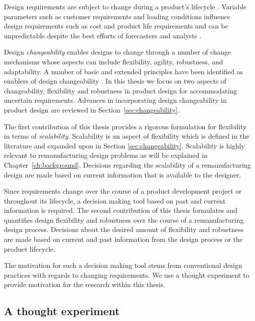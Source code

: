 Design requirements are subject to change during a product's lifecycle \cite{Goodall2014,Lindahl2007,Thierry2012,American2017}. Variable parameters such as customer requirements and loading conditions influence design requirements such as cost and product life requirements \cite{Fricke2005} and can be unpredictable despite the best efforts of forecasters and analysts \cite{DeNeufville2011}.

Design \textit{changeability} enables designs to change through a number of change mechanisms whose aspects can include flexibility, agility, robustness, and adaptability. A number of basic and extended principles have been identified as enablers of design changeability \cite{Fricke2005}. In this thesis we focus on two aspects of changeability, flexibility and robustness in product design for accommodating uncertain requirements. Advances in incorporating design changeability in product design are reviewed in Section~\ref{sec:changeability}.

The first contribution of this thesis provides a rigorous formulation for flexibility in terms of \textit{scalability}. Scalability is an aspect of flexibility which is defined in the literature and expanded upon in Section \ref{sec:changeability}. Scalability is highly relevant to remanufacturing design problems as will be explained in Chapter~\ref{ch:background}. Decisions regarding the scalability of a remanufacturing design are made based on current information that is available to the designer. 

Since requirements change over the course of a product development project or throughout its lifecycle, a decision making tool based on past and current information is required. The second contribution of this thesis formulates and quantifies design flexibility and robustness over the course of a remanufacturing design process. Decisions about the desired amount of flexibility and robustness are made based on current and past information from the design process or the product lifecycle.

The motivation for such a decision making tool stems from conventional design practices with regards to changing requirements. We use a thought experiment to provide motivation for the research within this thesis.

\subsection{A thought experiment} \label{subsec:thoughtexperiment}

